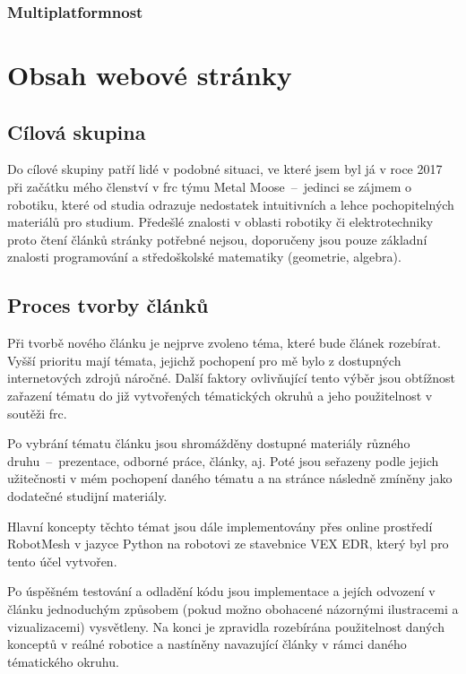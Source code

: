 \documentclass[a4paper, 12pt]{article}
\begin{document}
  \subsubsection{Multiplatformnost}

  \section{Obsah webové stránky}

  \subsection{Cílová skupina}
  Do cílové skupiny patří lidé v podobné situaci, ve které jsem byl já v roce 2017 při začátku mého členství v \gls{frc} týmu Metal Moose~--~jedinci se zájmem o robotiku, které od studia odrazuje nedostatek intuitivních a lehce pochopitelných materiálů pro studium. Předešlé znalosti v oblasti robotiky či elektrotechniky proto čtení článků stránky potřebné nejsou, doporučeny jsou pouze základní znalosti programování a středoškolské matematiky (geometrie, algebra).


  \subsection{Proces tvorby článků} \label{sec:Proces tvorby článků}
  Při tvorbě nového článku je nejprve zvoleno téma, které bude článek rozebírat. Vyšší prioritu mají témata, jejichž pochopení pro mě bylo z dostupných internetových zdrojů náročné. Další faktory ovlivňující tento výběr jsou obtížnost zařazení tématu do již vytvořených tématických okruhů a jeho použitelnost v soutěži \gls{frc}.

  Po vybrání tématu článku jsou shromážděny dostupné materiály různého druhu~--~prezentace, odborné práce, články, aj. Poté jsou seřazeny podle jejich užitečnosti v mém pochopení daného tématu a na stránce následně zmíněny jako dodatečné studijní materiály.

  Hlavní koncepty těchto témat jsou dále implementovány přes online prostředí RobotMesh v jazyce Python na robotovi ze stavebnice VEX EDR, který byl pro tento účel vytvořen.


  Po úspěšném testování a odladění kódu jsou implementace a jejích odvození v článku jednoduchým způsobem (pokud možno obohacené názornými ilustracemi a vizualizacemi) vysvětleny. Na konci je zpravidla rozebírána použitelnost daných konceptů v reálné robotice a nastíněny navazující články v rámci daného tématického okruhu.
\end{document}
